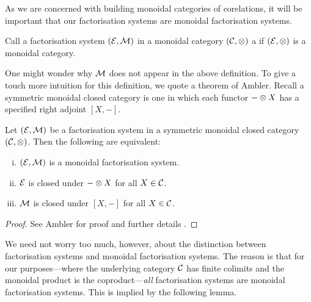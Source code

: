 As we are concerned with building monoidal categories of corelations, it will be
important that our factorisation systems are monoidal factorisation systems.

\begin{definition}
Call a factorisation system $(\mathcal E,\mathcal M)$ in a monoidal category $(\mathcal C,\otimes)$
a  if $(\mathcal E,\otimes)$ is a monoidal
category.
\end{definition}

One might wonder why $\mathcal M$ does not appear in the above definition. To give a
touch more intuition for this definition, we quote a theorem of Ambler. Recall a
symmetric monoidal closed category is one in which each functor $- \otimes X$ has a
specified right adjoint $[X,-]$. 
\begin{proposition}
  Let $(\mathcal E,\mathcal M)$ be a factorisation system in a symmetric monoidal
  closed category $(\mathcal C,\otimes)$. Then the following are equivalent:
  \begin{enumerate}[(i)]
    \item $(\mathcal E,\mathcal M)$ is a monoidal factorisation system.
    \item $\mathcal E$ is closed under $- \otimes X$ for all $X \in \mathcal C$.
    \item $\mathcal M$ is closed under $[X,-]$ for all $X \in \mathcal C$.
\end{enumerate}
\end{proposition}
\begin{proof}
  See Ambler for proof and further details \cite[Lemma 5.2.2]{Am}.
\end{proof}


We need not worry too much, however, about the distinction between factorisation
systems and monoidal factorisation systems. The reason is that for our
purposes---where the underlying category $\mathcal C$ has finite colimits and the
monoidal product is the coproduct---\emph{all} factorisation systems are
monoidal factorisation systems. This is implied by the following lemma.

